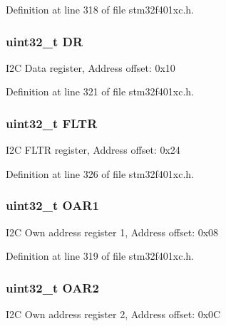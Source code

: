 Definition at line 318 of file stm32f401xc.\+h.

\subsubsection[{\texorpdfstring{DR}{DR}}]{ uint32\+\_\+t DR}\hypertarget{struct_i2_c___type_def_a3df0d8dfcd1ec958659ffe21eb64fa94}{}\label{struct_i2_c___type_def_a3df0d8dfcd1ec958659ffe21eb64fa94}
I2C Data register, Address offset\+: 0x10 

Definition at line 321 of file stm32f401xc.\+h.

\subsubsection[{\texorpdfstring{F\+L\+TR}{FLTR}}]{ uint32\+\_\+t F\+L\+TR}\hypertarget{struct_i2_c___type_def_aa23ced8246d69edb9261a8de1f1e253f}{}\label{struct_i2_c___type_def_aa23ced8246d69edb9261a8de1f1e253f}
I2C F\+L\+TR register, Address offset\+: 0x24 

Definition at line 326 of file stm32f401xc.\+h.

\subsubsection[{\texorpdfstring{O\+A\+R1}{OAR1}}]{ uint32\+\_\+t O\+A\+R1}\hypertarget{struct_i2_c___type_def_a08b4be0d626a00f26bc295b379b3bba6}{}\label{struct_i2_c___type_def_a08b4be0d626a00f26bc295b379b3bba6}
I2C Own address register 1, Address offset\+: 0x08 

Definition at line 319 of file stm32f401xc.\+h.

\subsubsection[{\texorpdfstring{O\+A\+R2}{OAR2}}]{ uint32\+\_\+t O\+A\+R2}\hypertarget{struct_i2_c___type_def_ab5c57ffed0351fa064038939a6c0bbf6}{}\label{struct_i2_c___type_def_ab5c57ffed0351fa064038939a6c0bbf6}
I2C Own address register 2, Address offset\+: 0x0C 

